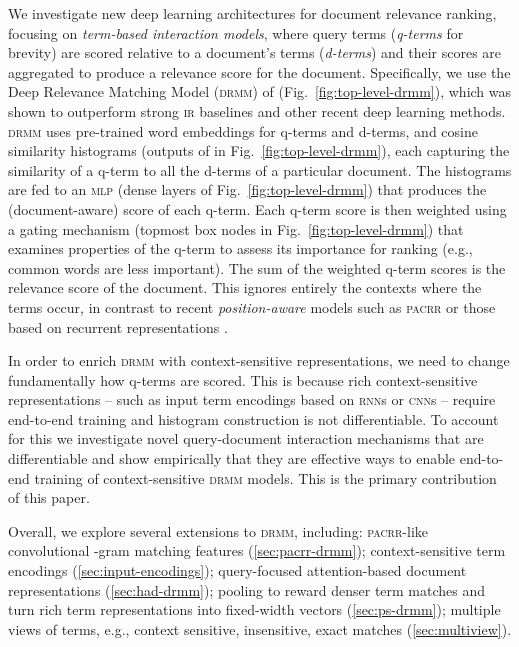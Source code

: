 \documentclass[11pt,a4paper]{article}
\newcommand{\mlp}{\textsc{mlp}\xspace}
\newcommand{\rnn}{\textsc{rnn}\xspace}
\newcommand{\cnn}{\textsc{cnn}\xspace}
\newcommand{\ir}{\textsc{ir}\xspace}
\newcommand{\drmm}{\textsc{drmm}\xspace}
\newcommand{\pacrr}{\textsc{pacrr}\xspace}
\begin{document}
We investigate new deep learning architectures for document relevance ranking, focusing on 
\emph{term-based interaction models}, where
query terms (\emph{q-terms} for brevity) are scored relative to a document's terms (\emph{d-terms}) and their scores are aggregated to produce a relevance score for the document. Specifically, we use the Deep Relevance Matching Model (\drmm) of  (Fig.~\ref{fig:top-level-drmm}), which was shown to outperform  
strong \ir baselines and other recent deep learning methods. 
\drmm uses pre-trained word embeddings for 
q-terms and d-terms, and cosine similarity histograms (outputs of  in Fig.~\ref{fig:top-level-drmm}), each capturing the similarity of a 
q-term to all the d-terms of a particular document. 
The histograms are fed to an \mlp
(dense layers of Fig.~\ref{fig:top-level-drmm})
that produces the (document-aware) score of each q-term.
Each q-term score is then weighted using a gating mechanism (topmost box nodes in Fig.~\ref{fig:top-level-drmm}) that examines properties of the q-term to assess its importance for ranking (e.g., common words are less important). The sum of the weighted q-term scores is the relevance score of the document.
This ignores entirely the contexts where the terms occur, in contrast to recent \emph{position-aware} models such as \pacrr \cite{hui2017pacrr} or those based on recurrent representations \cite{palangi2016deep}.

In order to enrich \drmm with context-sensitive representations, we need to change fundamentally how q-terms are scored. This is because rich context-sensitive representations -- such as input term encodings based on \rnn{s} or \cnn{s} -- require end-to-end training and histogram construction is not differentiable. To account for this we investigate novel query-document interaction mechanisms that are differentiable and show empirically that they are effective ways to enable end-to-end training of context-sensitive \drmm models. This is the primary contribution of this paper.

Overall, we explore several extensions to \drmm, including: \pacrr-like convolutional -gram matching
features (\ref{sec:pacrr-drmm});
context-sensitive term encodings (\ref{sec:input-encodings}); 
query-focused attention-based document representations (\ref{sec:had-drmm});
pooling to reward denser term matches and turn rich term representations into fixed-width vectors (\ref{sec:ps-drmm});
multiple views of terms, e.g., context sensitive, insensitive, exact matches (\ref{sec:multiview}).
\end{document}
